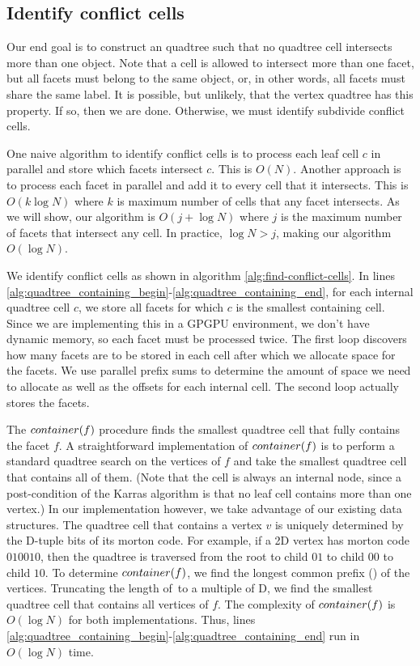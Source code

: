 \documentclass[submission]{gmp2017}
\begin{document}
\subsection{Identify conflict cells}

Our end goal is to construct an quadtree such that no quadtree cell intersects more than one object. Note that a cell is allowed to intersect more than one facet, but all facets must belong to the same object, or, in other words, all facets must share the same label. It is possible, but unlikely, that the vertex quadtree has this property. If so, then we are done. Otherwise, we must identify subdivide conflict cells.

One naive algorithm to identify conflict cells is to process each leaf cell $c$ in parallel and store which facets intersect $c$. This is $O(N)$. Another approach is to process each facet in parallel and add it to every cell that it intersects. This is $O(k\log{N})$ where $k$ is maximum number of cells that any facet intersects. As we will show, our algorithm is $O(j + \log{N})$ where $j$ is the maximum number of facets that intersect any cell. In practice, $\log{N} > j$, making our algorithm $O(\log{N})$.

We identify conflict cells as shown in algorithm \ref{alg:find-conflict-cells}. In lines \ref{alg:quadtree_containing_begin}-\ref{alg:quadtree_containing_end}, for each internal quadtree cell $c$, we store all facets for which $c$ is the smallest containing cell. Since we are implementing this in a GPGPU environment, we don't have dynamic memory, so each facet must be processed twice. The first loop discovers how many facets are to be stored in each cell after which we allocate space for the facets. We use parallel prefix sums to determine the amount of space we need to allocate as well as the offsets for each internal cell. The second loop actually stores the facets.

The $container(f)$ procedure finds the smallest quadtree cell that fully contains the facet $f$. A straightforward implementation of $container(f)$ is to perform a standard quadtree search on the vertices of $f$ and take the smallest quadtree cell that contains all of them. (Note that the cell is always an internal node, since a post-condition of the Karras algorithm is that no leaf cell contains more than one vertex.) In our implementation however, we take advantage of our existing data structures. The quadtree cell that contains a vertex $v$ is uniquely determined by the D-tuple bits of its morton code. For example, if a 2D vertex has morton code $010010$, then the quadtree is traversed from the root to child $01$ to child $00$ to child $10$. To determine $container(f)$, we find the longest common prefix (\lcp) of the vertices. Truncating the length of \lcp\,to a multiple of D, we find the smallest quadtree cell that contains all vertices of $f$. The complexity of $container(f)$ is $O(\log{N})$ for both implementations. Thus, lines \ref{alg:quadtree_containing_begin}-\ref{alg:quadtree_containing_end} run in $O(\log{N})$ time.
\end{document}
